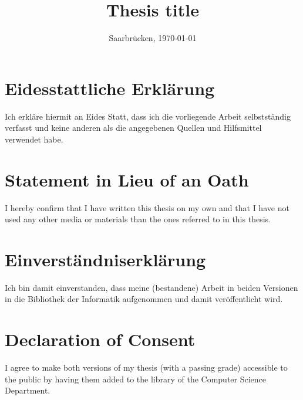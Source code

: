 \documentclass[11pt, a4paper, twoside]{Thesis}
\begin{document}


\frontmatter

\title  {Thesis title}

\addresses  {\groupname\\\deptname\\\univname}  %
\date       {Saarbr\"ucken, \today }
\subject    {}
\keywords   {}

\maketitle



\thispagestyle{empty}

\section*{Eidesstattliche Erkl\"{a}rung}
Ich erkl\"{a}re hiermit an Eides Statt, dass ich die vorliegende Arbeit selbstst\"{a}ndig verfasst und keine
anderen als die angegebenen Quellen und Hilfsmittel verwendet habe.

\vspace{0.60cm}
\section*{Statement in Lieu of an Oath}
I hereby confirm that I have written this thesis on my own and that I have not used any other media or
materials than the ones referred to in this thesis.
\vspace{1.5cm}

\section*{Einverst\"{a}ndniserkl\"{a}rung}
Ich bin damit einverstanden, dass meine (bestandene) Arbeit in beiden Versionen in die Bibliothek der
Informatik aufgenommen und damit ver\"{o}ffentlicht wird.

\vspace{0.60cm}
\section*{Declaration of Consent}
I agree to make both versions of my thesis (with a passing grade) accessible to the public by having
them added to the library of the Computer Science Department.
\vspace{3cm}
\end{document}
